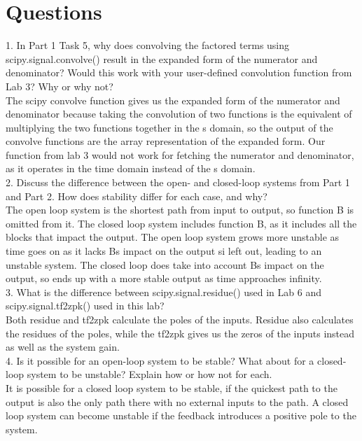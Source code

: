 \documentclass[11pt,a4]{article}
\begin{document}
\section{Questions}
1. In Part 1 Task 5, why does convolving the factored terms using scipy.signal.convolve() result in the expanded form of the numerator and denominator? Would this work with your user-defined convolution function from Lab 3? Why or why not?\\

The scipy convolve function gives us the expanded form of the numerator and denominator because taking the convolution of two functions is the equivalent of multiplying the two functions together in the s domain, so the output of the convolve functions are the array representation of the expanded form. Our function from lab 3 would not work for fetching the numerator and denominator, as it operates in the time domain instead of the s domain.\\

2. Discuss the difference between the open- and closed-loop systems from Part 1 and Part 2. How does stability differ for each case, and why?\\

The open loop system is the shortest path from input to output, so function B is omitted from it. The closed loop system includes function B, as it includes all the blocks that impact the output. The open loop system grows more unstable as time goes on as it lacks Bs impact on the output si left out, leading to an unstable system. The closed loop does take into account Bs impact on the output, so ends up with a more stable output as time approaches infinity.\\

3. What is the difference between scipy.signal.residue() used in Lab 6 and scipy.signal.tf2zpk() used in this lab?\\

Both residue and tf2zpk calculate the poles of the inputs. Residue also calculates the residues of the poles, while the tf2zpk gives us the zeros of the inputs instead as well as the system gain.\\

4. Is it possible for an open-loop system to be stable? What about for a closed-loop system to be unstable? Explain how or how not for each.\\

It is possible for a closed loop system to be stable, if the quickest path to the output is also the only path there with no external inputs to the path. A closed loop system can become unstable if the feedback introduces a positive pole to the system.\\
\end{document}
